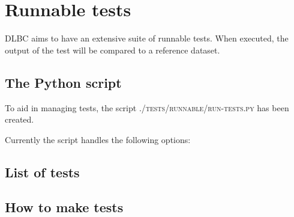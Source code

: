 \documentclass{article}
\begin{document}
\section{Runnable tests}

DLBC aims to have an extensive suite of runnable tests. When executed, the output of the test will be compared to a reference dataset.

\subsection{The Python script}

To aid in managing tests, the script \textsc{./tests/runnable/run-tests.py} has been created.

Currently the script handles the following options:



\subsection{List of tests}



\subsection{How to make tests}
\end{document}
